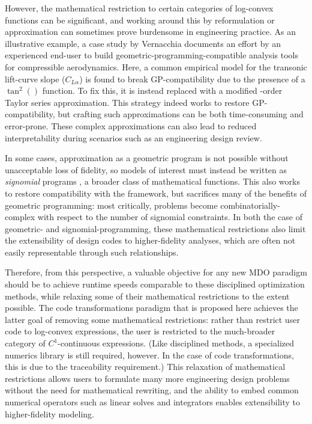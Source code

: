 However, the mathematical restriction to certain categories of log-convex functions can be significant, and working around this by reformulation or approximation can sometimes prove burdensome in engineering practice. As an illustrative example, a case study by Vernacchia \cite{vernacchia_gpkit} documents an effort by an experienced end-user to build geometric-programming-compatible analysis tools for compressible aerodynamics. Here, a common empirical model for the transonic lift-curve slope ($C_{L\alpha}$) is found to break GP-compatibility due to the presence of a $\tan^2()$ function. To fix this, it is instead replaced with a modified -order Taylor series approximation. This strategy indeed works to restore GP-compatibility, but crafting such approximations can be both time-consuming and error-prone. These complex approximations can also lead to reduced interpretability during scenarios such as an engineering design review.

In some cases, approximation as a geometric program is not possible without unacceptable loss of fidelity, so models of interest must instead be written as \emph{signomial} programs \cite{ozturk_optimal_2021, kirschen}, a broader class of mathematical functions. This also works to restore compatibility with the framework, but sacrifices many of the benefits of geometric programming: most critically, problems become combinatorially-complex with respect to the number of signomial constraints. In both the case of geometric- and signomial-programming, these mathematical restrictions also limit the extensibility of design codes to higher-fidelity analyses, which are often not easily representable through such relationships.

Therefore, from this perspective, a valuable objective for any new MDO paradigm should be to achieve runtime speeds comparable to these disciplined optimization methods, while relaxing some of their mathematical restrictions to the extent possible. The code transformations paradigm that is proposed here achieves the latter goal of removing some mathematical restrictions: rather than restrict user code to log-convex expressions, the user is restricted to the much-broader category of $C^1$-continuous expressions. (Like disciplined methods, a specialized numerics library is still required, however. In the case of code transformations, this is due to the traceability requirement.) This relaxation of mathematical restrictions allows users to formulate many more engineering design problems without the need for mathematical rewriting, and the ability to embed common numerical operators such as linear solves and integrators enables extensibility to higher-fidelity modeling.

